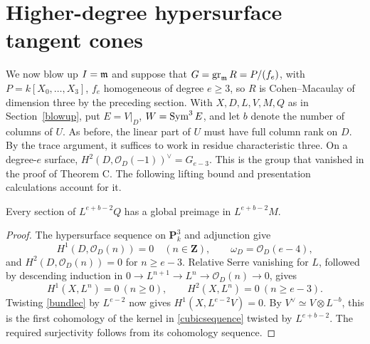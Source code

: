 \section{Higher-degree hypersurface tangent cones}\label{higher-surfaces}
We now blow up $I=\mathfrak m$ and suppose that
$G=\operatorname{gr}_{\mathfrak m}R=P/(f_e)$, with $P=k[X_0,\ldots,X_3]$,
$f_e$ homogeneous of degree $e\ge3$, so $R$ is Cohen--Macaulay of dimension three by the preceding section.
With $X,D,L,V,M,Q$ as in Section~\ref{blowup}, put
$E=V|_D$, $W=\operatorname{Sym}^3 E$, and let $b$ denote the number of columns of $U$.
As before, the linear part of $U$ must have full column rank on $D$.
By the trace argument, it suffices to work in residue characteristic three.
On a degree-$e$ surface, $H^2(D,\mathcal O_D(-1))^\vee=G_{e-3}$.
This is the group that vanished in the proof of Theorem C. The following lifting bound and presentation calculations account for it.
\begin{lemma}\label{high-order-cubic-lifting}
Every section of $L^{e+b-2}Q$ has a global preimage in
$L^{e+b-2}M$.
\end{lemma}
\begin{proof}
The hypersurface sequence on $\mathbf P^3_k$ and adjunction give
\[
 H^1(D,\mathcal O_D(n))=0\quad(n\in\mathbf Z),\qquad
 \omega_D=\mathcal O_D(e-4),
\]
and $H^2(D,\mathcal O_D(n))=0$ for $n\ge e-3$.
Relative Serre vanishing for $L$, followed by descending induction in
$0\to L^{n+1}\to L^n\to\mathcal O_D(n)\to0$, gives
\[
 H^1(X,L^n)=0\ (n\ge0),\qquad H^2(X,L^n)=0\ (n\ge e-3).
\]
Twisting \eqref{bundlec} by $L^{e-2}$ now gives
$H^1(X,L^{e-2}V)=0$.
By $V^\vee\simeq V\otimes L^{-b}$, this is the first cohomology of
the kernel in \eqref{cubicsequence} twisted by $L^{e+b-2}$.
The required surjectivity follows from its cohomology sequence.
\end{proof}

